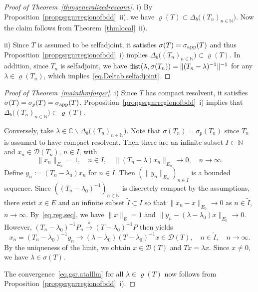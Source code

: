 \documentclass[a4paper,reqno]{amsart}
\begin{document}
{\begin{proof}[Proof of Theorem~{\rm\ref{thmgeneralizedresconv}}]
i)
By Proposition~\ref{propgsrgnrregionofbdd}~ii), we have $\varrho(T)\subset\Delta_b\big((T_n)_{n\in{\mathbb{N}}}\big)$. Now the claim follows from Theorem~\ref{thmlocal}~ii).

ii)
Since $T$ is assumed to be selfadjoint, it satisfies $\sigma(T)=\sigma_{\rm app}(T)$ and thus Proposition~\ref{propgsrgnrregionofbdd}~i) implies $\Delta_b\big((T_n)_{n\in{\mathbb{N}}}\big)\subset\varrho(T)$.
In addition, since $T_n$ is selfadjoint, we have ${\rm dist}(\lambda,\sigma(T_n))=\|(T_n-\lambda)^{-1}\|^{-1}$ for any $\lambda\in\varrho(T_n)$, which implies~\eqref{eq.Deltab.selfadjoint}. 
\end{proof}

\begin{proof}[Proof of Theorem~{\rm\ref{mainthmforgsr}}]
i) Since $T$ has compact resolvent, it satisfies $\sigma(T)=\sigma_p(T)=\sigma_{\rm app}(T)$.
Proposition~\ref{propgsrgnrregionofbdd}~i)  implies that $\Delta_b\big((T_n)_{n\in{\mathbb{N}}}\big)\subset\varrho(T)$.

Conversely, take $\lambda\in {\mathbb{C}}\backslash\Delta_b\big((T_n)_{n\in{\mathbb{N}}}\big)$. Note that $\sigma(T_n)=\sigma_p(T_n)$ since $T_n$ is assumed to have compact resolvent.
Then there are an infinite subset $I\subset {\mathbb{N}}$ and $x_n\in {\mathcal D}(T_n)$, $n\in I$, with 
\begin{equation}\label{eq.reg.seq}
\|x_n\|_{E_n}=1, \quad n\in I, \quad \|(T_n-\lambda)x_n\|_{E_n}{\longrightarrow} 0, \quad n\to\infty.
\end{equation}
Define $y_n:=(T_n-\lambda_0)x_n$ for $n\in I.$
Then $(\|y_n\|_{E_n})_{n\in I}$ is a bounded sequence.
Since  $\left((T_n-\lambda_0)^{-1}\right)_{n\in{\mathbb{N}}}$ is discretely compact by the assumptions, there exist
$x\in E$ and an infinite subset $\widetilde I\subset I$ so that $\|x_n-x\|_{E_0}\to 0$ as $n\in\widetilde I$, $n\to\infty$.
By~\eqref{eq.reg.seq}, we have $\|x\|_E=1$ and $\|y_n-(\lambda-\lambda_0)x\|_{E_0}\to 0$.
However, $(T_n-\lambda_0)^{-1}P_n{\stackrel{s}{\rightarrow}} (T-\lambda_0)^{-1}P$ then yields
$$x_n=(T_n-\lambda_0)^{-1}y_n{\longrightarrow} (\lambda-\lambda_0)(T-\lambda_0)^{-1}x\in{\mathcal D}(T),\quad n\in \widetilde I,\quad  n\to\infty.$$ 
By the uniqueness of the limit, we obtain $x\in{\mathcal D}(T)$ and $Tx=\lambda x$.
Since $x\neq 0$, we have $\lambda\in\sigma(T)$.

The convergence~\eqref{eq.gsr.atalllm} for all $\lambda\in\varrho(T)$ now follows from Proposition~\ref{propgsrgnrregionofbdd}~i).


\end{proof}}
\end{document}
